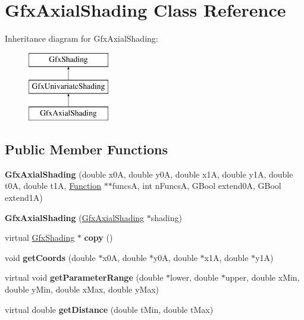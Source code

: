 \hypertarget{class_gfx_axial_shading}{}\section{Gfx\+Axial\+Shading Class Reference}
\label{class_gfx_axial_shading}
Inheritance diagram for Gfx\+Axial\+Shading\+:\begin{figure}[H]
\begin{center}
\leavevmode
\includegraphics[height=3.000000cm]{class_gfx_axial_shading}
\end{center}
\end{figure}
\subsection*{Public Member Functions}
\begin{DoxyCompactItemize}
\item 
\mbox{\label{class_gfx_axial_shading_ac2b6bd79fb8e564b4e65f92c71c88f9c}} 
{\bfseries Gfx\+Axial\+Shading} (double x0A, double y0A, double x1A, double y1A, double t0A, double t1A, \hyperlink{class_function}{Function} $\ast$$\ast$funcsA, int n\+FuncsA, G\+Bool extend0A, G\+Bool extend1A)
\item 
\mbox{\label{class_gfx_axial_shading_ae9872b4807fb8bbd596ca26b3ae8c41f}} 
{\bfseries Gfx\+Axial\+Shading} (\hyperlink{class_gfx_axial_shading}{Gfx\+Axial\+Shading} $\ast$shading)
\item 
\mbox{\label{class_gfx_axial_shading_ac1d6e06137e4ea7e84824b3b49849ef8}} 
virtual \hyperlink{class_gfx_shading}{Gfx\+Shading} $\ast$ {\bfseries copy} ()
\item 
\mbox{\label{class_gfx_axial_shading_ab7b0764e82ffd163ea0bb03c51cc8f0b}} 
void {\bfseries get\+Coords} (double $\ast$x0A, double $\ast$y0A, double $\ast$x1A, double $\ast$y1A)
\item 
\mbox{\label{class_gfx_axial_shading_a22567f610f146b352ad1eb74b0bb2242}} 
virtual void {\bfseries get\+Parameter\+Range} (double $\ast$lower, double $\ast$upper, double x\+Min, double y\+Min, double x\+Max, double y\+Max)
\item 
\mbox{\label{class_gfx_axial_shading_ad88eca6d5eab36277b56353dea658c7b}} 
virtual double {\bfseries get\+Distance} (double t\+Min, double t\+Max)
\end{DoxyCompactItemize}
